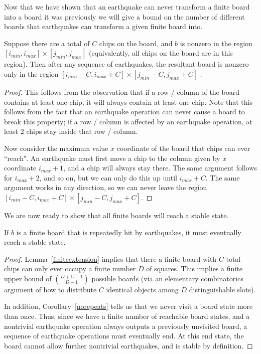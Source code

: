 \documentclass[runningheads,a4paper]{llncs}
\begin{document}
Now that we have shown that an earthquake can never transform a finite board into a board it was previously we will give a bound on the number of different boards that earthquakes can transform a given finite board into.
\begin{lemma}
\label{finiteextension}
Suppose there are a total of $C$ chips on the board, and $b$ is nonzero in the region $[i_{min}, i_{max}] \times [j_{min}, j_{max}]$ (equivalently, all chips on the board are in this region). Then after any sequence of earthquakes, the resultant board is nonzero only in the region $[i_{min}-C, i_{max}+C] \times [j_{min}-C, j_{max}+C]$ .
\end{lemma}

\begin{proof}
This follows from the observation that if a row / column of the board contains at least one chip, it will always contain at least one chip. Note that this follows from the fact that an earthquake operation can never cause a board to break this property; if a row / column is affected by an earthquake operation, at least 2 chips stay inside that row / column.

Now consider the maximum value $x$ coordinate of the board that chips can ever ``reach". An earthquake must first move a chip to the column given by $x$ coordinate $i_{max} +1$, and a chip will always stay there. The same argument follows for $i_{max} + 2$, and so on, but we can only do this up until $i_{max} +C$. The same argument works in any direction, so we can never leave the region $[i_{min}-C, i_{max}+C] \times [j_{min}-C, j_{max}+C]$.
\end{proof}

We are now ready to show that all finite boards will reach a stable state. 

\begin{theorem} If $b$ is a finite board that is repeatedly hit by earthquakes, it must eventually reach a stable state. 
\end{theorem}
\label{finitestability}
\begin{proof}
Lemma~\ref{finiteextension} implies that there a finite board with $C$ total chips can only ever occupy a finite number $D$ of squares. This implies a finite upper bound of $\binom{D+C-1}{D-1}$ possible boards (via an elementary combinatorics argument of how to distribute $C$ identical objects among $D$ distinguishable slots).

In addition, Corollary~\ref{norepeats} tells us that we never visit a board state more than once. Thus, since we have a finite number of reachable board states, and a nontrivial earthquake operation always outputs a previously unvisited board, a sequence of earthquake operations must eventually end. At this end state, the board cannot allow further nontrivial earthquakes, and is stable by definition.
\end{proof}
\end{document}
